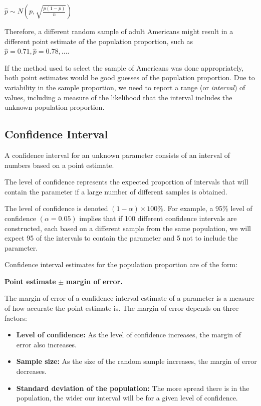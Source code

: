 \documentclass[
]{book}
\providecommand{\tightlist}{%
  \setlength{\itemsep}{0pt}\setlength{\parskip}{0pt}}
\begin{document}
\(\hat{p}\sim N \left( p, \sqrt{\frac{p(1-p)}{n}} \right)\)

Therefore, a different random sample of adult Americans might result in a different point estimate of the population proportion, such as \(\hat{p}= 0.71, \hat{p}= 0.78, \ldots\).

If the method used to select the sample of Americans was done appropriately, both point estimates would be good guesses of the population proportion. Due to variability in the sample proportion, we need to report a range (or \emph{interval}) of values, including a measure of the likelihood that the interval includes the unknown population proportion.

\subsection{Confidence Interval}\label{confidence-interval}

A confidence interval for an unknown parameter consists of an interval of numbers based on a point estimate.

The level of confidence represents the expected proportion of intervals that will contain the parameter if a large number of different samples is obtained.

The level of confidence is denoted \((1 - \alpha) \times 100\%\). For example, a 95\% level of confidence \((\alpha = 0.05)\) implies that if 100 different confidence intervals are constructed, each based on a different sample from the same population, we will expect 95 of the intervals to contain the parameter and 5 not to include the parameter.

Confidence interval estimates for the population proportion are of the form:

\textbf{Point estimate} \(\pm\) \textbf{margin of error.}

The margin of error of a confidence interval estimate of a parameter is a measure of how accurate the point estimate is. The margin of error depends on three factors:

\begin{itemize}
\tightlist
\item
  \textbf{Level of confidence:} As the level of confidence increases, the margin of error also increases.
\item
  \textbf{Sample size:} As the size of the random sample increases, the margin of error decreases.
\item
  \textbf{Standard deviation of the population:} The more spread there is in the population, the wider our interval will be for a given level of confidence.
\end{itemize}
\end{document}
